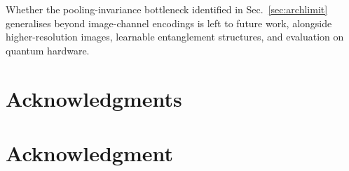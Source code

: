 \documentclass[conference,compsoc]{IEEEtran}
\begin{document}
Whether the pooling-invariance bottleneck identified in Sec.~\ref{sec:archlimit} generalises beyond image-channel encodings is left to future work, alongside higher-resolution images, learnable entanglement structures, and evaluation on quantum hardware.

\ifCLASSOPTIONcompsoc
  \section*{Acknowledgments}
\else
  \section*{Acknowledgment}
\fi

\end{document}
